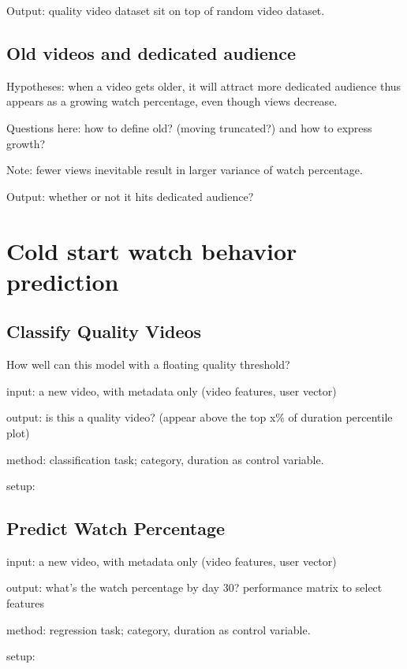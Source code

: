 Output: quality video dataset sit on top of random video dataset.


\subsection{Old videos and dedicated audience}

Hypotheses: when a video gets older, it will attract more dedicated audience thus appears as a growing watch percentage, even though views decrease.

Questions here: how to define old? (moving truncated?) and how to express growth?

Note: fewer views inevitable result in larger variance of watch percentage.

Output: whether or not it hits dedicated audience?



\section{Cold start watch behavior prediction}

\subsection{Classify Quality Videos}
How well can this model with a floating quality threshold?

input: a new video, with metadata only (video features, user vector)

output: is this a quality video? (appear above the top x\% of duration percentile plot)

method: classification task; category, duration as control variable.

setup: 

\subsection{Predict Watch Percentage}
input: a new video, with metadata only (video features, user vector)

output: what's the watch percentage by day 30? performance matrix to select features

method: regression task; category, duration as control variable.

setup: 


